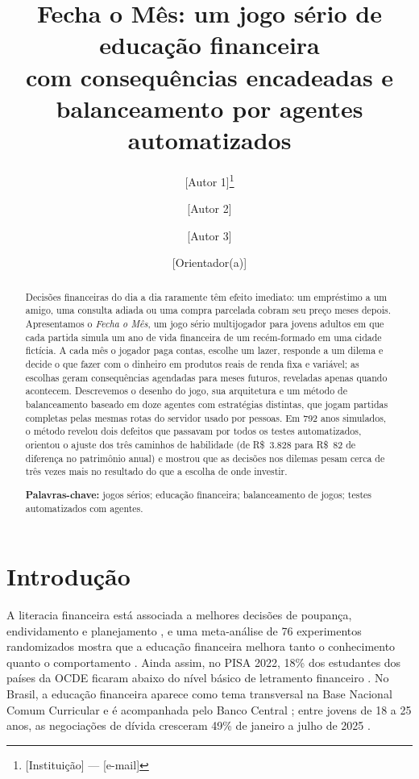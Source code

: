 \documentclass[11pt,a4paper]{article}
\title{\textbf{Fecha o Mês}: um jogo sério de educação financeira\\com consequências encadeadas e balanceamento por agentes automatizados}
\author{[Autor 1]\thanks{[Instituição] --- [e-mail]} \and [Autor 2] \and [Autor 3] \and [Orientador(a)]}
\date{}
\begin{document}
\maketitle

\begin{abstract}
Decisões financeiras do dia a dia raramente têm efeito imediato: um empréstimo a um amigo, uma consulta adiada ou uma compra parcelada cobram seu preço meses depois. Apresentamos o \emph{Fecha o Mês}, um jogo sério multijogador para jovens adultos em que cada partida simula um ano de vida financeira de um recém-formado em uma cidade fictícia. A cada mês o jogador paga contas, escolhe um lazer, responde a um dilema e decide o que fazer com o dinheiro em produtos reais de renda fixa e variável; as escolhas geram consequências agendadas para meses futuros, reveladas apenas quando acontecem. Descrevemos o desenho do jogo, sua arquitetura e um método de balanceamento baseado em doze agentes com estratégias distintas, que jogam partidas completas pelas mesmas rotas do servidor usado por pessoas. Em 792 anos simulados, o método revelou dois defeitos que passavam por todos os testes automatizados, orientou o ajuste dos três caminhos de habilidade (de R\$~3.828 para R\$~82 de diferença no patrimônio anual) e mostrou que as decisões nos dilemas pesam cerca de três vezes mais no resultado do que a escolha de onde investir.

\medskip
\noindent\textbf{Palavras-chave:} jogos sérios; educação financeira; balanceamento de jogos; testes automatizados com agentes.
\end{abstract}

\section{Introdução}

A literacia financeira está associada a melhores decisões de poupança, endividamento e planejamento \cite{lusardi2014}, e uma meta-análise de 76 experimentos randomizados mostra que a educação financeira melhora tanto o conhecimento quanto o comportamento \cite{kaiser2022}. Ainda assim, no PISA 2022, 18\% dos estudantes dos países da OCDE ficaram abaixo do nível básico de letramento financeiro \cite{oecd2024}. No Brasil, a educação financeira aparece como tema transversal na Base Nacional Comum Curricular \cite{bncc2018} e é acompanhada pelo Banco Central \cite{bcb2021}; entre jovens de 18 a 25 anos, as negociações de dívida cresceram 49\% de janeiro a julho de 2025 \cite{serasa2025}.
\end{document}
